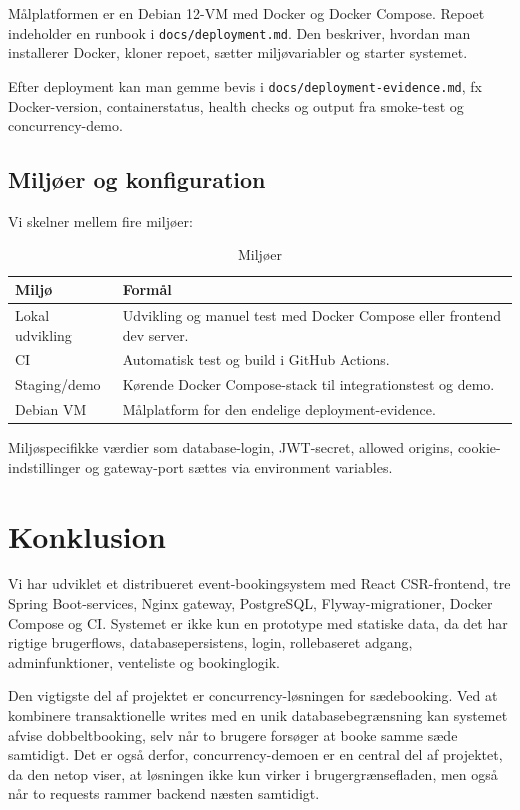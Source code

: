 \documentclass[11pt,a4paper]{article}
\newcommand{\filepath}[1]{\texttt{#1}}
\begin{document}
Målplatformen er en Debian 12-VM med Docker og Docker Compose. Repoet indeholder en runbook i \filepath{docs/deployment.md}. Den beskriver, hvordan man installerer Docker, kloner repoet, sætter miljøvariabler og starter systemet.

Efter deployment kan man gemme bevis i \filepath{docs/deployment-evidence.md}, fx Docker-version, containerstatus, health checks og output fra smoke-test og concurrency-demo.

\subsection{Miljøer og konfiguration}

Vi skelner mellem fire miljøer:

\begin{table}[h]
\centering
\caption{Miljøer}
\begin{tabularx}{\textwidth}{@{}L{3.4cm}Y@{}}
\toprule
Miljø & Formål \\
\midrule
Lokal udvikling & Udvikling og manuel test med Docker Compose eller frontend dev server. \\
CI & Automatisk test og build i GitHub Actions. \\
Staging/demo & Kørende Docker Compose-stack til integrationstest og demo. \\
Debian VM & Målplatform for den endelige deployment-evidence. \\
\bottomrule
\end{tabularx}
\end{table}

Miljøspecifikke værdier som database-login, JWT-secret, allowed origins, cookie-indstillinger og gateway-port sættes via environment variables.

\section{Konklusion}

Vi har udviklet et distribueret event-bookingsystem med React CSR-frontend, tre Spring Boot-services, Nginx gateway, PostgreSQL, Flyway-migrationer, Docker Compose og CI. Systemet er ikke kun en prototype med statiske data, da det har rigtige brugerflows, databasepersistens, login, rollebaseret adgang, adminfunktioner, venteliste og bookinglogik.

Den vigtigste del af projektet er concurrency-løsningen for sædebooking. Ved at kombinere transaktionelle writes med en unik databasebegrænsning kan systemet afvise dobbeltbooking, selv når to brugere forsøger at booke samme sæde samtidigt. Det er også derfor, concurrency-demoen er en central del af projektet, da den netop viser, at løsningen ikke kun virker i brugergrænsefladen, men også når to requests rammer backend næsten samtidigt.
\end{document}

